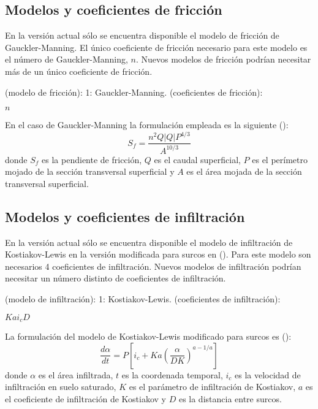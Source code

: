 \documentclass[a4paper,12pt]{report}
\begin{document}
\subsection{Modelos y coeficientes de fricción}

En la versión actual sólo se encuentra disponible el modelo de fricción de
Gauckler-Manning. El único coeficiente de fricción necesario para este modelo es
el número de Gauckler-Manning, $n$. Nuevos modelos de fricción podrían necesitar
más de un único coeficiente de fricción.
\begin{verbatimtab}[4]
(modelo de fricción): 
		1: Gauckler-Manning.
(coeficientes de fricción):
\end{verbatimtab}
\vspace{-0.60cm}
\hspace{1.8cm}$n$

En el caso de Gauckler-Manning la formulación empleada es la siguiente
(\cite{JaviSurcos1}):
\begin{equation}
S_f=\frac{n^2 Q|Q|P^{4/3}}{A^{10/3}}
\end{equation}
\noindent donde $S_f$ es la pendiente de fricción, $Q$ es el caudal superficial,
$P$ es el perímetro mojado de la sección transversal superficial y $A$ es el
área mojada de la sección transversal superficial. 

\subsection{Modelos y coeficientes de infiltración}

En la versión actual sólo se encuentra disponible el modelo de infiltración de
Kostiakov-Lewis en la versión modificada para surcos en (\cite{JaviSurcos1}).
Para este modelo son necesarios 4 coeficientes de infiltración. Nuevos modelos
de infiltración podrían necesitar un número distinto de coeficientes de
infiltración.
\begin{verbatimtab}[4]
(modelo de infiltración): 
		1: Kostiakov-Lewis.
(coeficientes de infiltración):
\end{verbatimtab}
\vspace{-0.5cm}
\hspace{1.8cm}$K$\hspace{0.9cm}$a$\hspace{0.9cm}$i_c$\hspace{0.9cm}$D$

La formulación del modelo de Kostiakov-Lewis modificado para surcos es
(\cite{JaviSurcos1}):
\begin{equation}
\frac{d\alpha}{dt}=
P\left[ i_c + Ka \left( \frac{\alpha}{DK} \right)^{a-1/a} \right]
\end{equation}
\noindent donde $\alpha$ es el área infiltrada, $t$ es la coordenada temporal,
$i_c$ es la velocidad de infiltración en suelo saturado, $K$ es el parámetro de
infiltración de Kostiakov, $a$ es el coeficiente de infiltración de Kostiakov y
$D$ es la distancia entre surcos.
\end{document}
